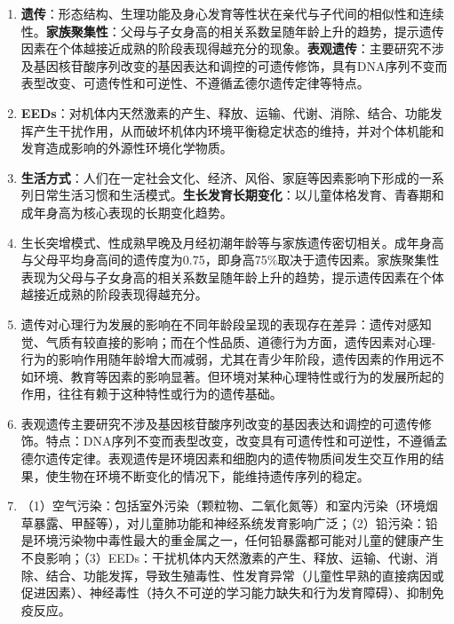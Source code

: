 \begin{enumerate}[leftmargin=*, itemsep=5pt]
    \item \textbf{遗传}：形态结构、生理功能及身心发育等性状在亲代与子代间的相似性和连续性。\textbf{家族聚集性}：父母与子女身高的相关系数呈随年龄上升的趋势，提示遗传因素在个体越接近成熟的阶段表现得越充分的现象。\textbf{表观遗传}：主要研究不涉及基因核苷酸序列改变的基因表达和调控的可遗传修饰，具有DNA序列不变而表型改变、可遗传性和可逆性、不遵循孟德尔遗传定律等特点。

    \item \textbf{EEDs}：对机体内天然激素的产生、释放、运输、代谢、消除、结合、功能发挥产生干扰作用，从而破坏机体内环境平衡稳定状态的维持，并对个体机能和发育造成影响的外源性环境化学物质。

    \item \textbf{生活方式}：人们在一定社会文化、经济、风俗、家庭等因素影响下形成的一系列日常生活习惯和生活模式。\textbf{生长发育长期变化}：以儿童体格发育、青春期和成年身高为核心表现的长期变化趋势。

    \item 生长突增模式、性成熟早晚及月经初潮年龄等与家族遗传密切相关。成年身高与父母平均身高间的遗传度为0.75，即身高75\%取决于遗传因素。家族聚集性表现为父母与子女身高的相关系数呈随年龄上升的趋势，提示遗传因素在个体越接近成熟的阶段表现得越充分。

    \item 遗传对心理行为发展的影响在不同年龄段呈现的表现存在差异：遗传对感知觉、气质有较直接的影响；而在个性品质、道德行为方面，遗传因素对心理-行为的影响作用随年龄增大而减弱，尤其在青少年阶段，遗传因素的作用远不如环境、教育等因素的影响显著。但环境对某种心理特性或行为的发展所起的作用，往往有赖于这种特性或行为的遗传基础。

    \item 表观遗传主要研究不涉及基因核苷酸序列改变的基因表达和调控的可遗传修饰。特点：DNA序列不变而表型改变，改变具有可遗传性和可逆性，不遵循孟德尔遗传定律。表观遗传是环境因素和细胞内的遗传物质间发生交互作用的结果，使生物在环境不断变化的情况下，能维持遗传序列的稳定。

    \item （1）空气污染：包括室外污染（颗粒物、二氧化氮等）和室内污染（环境烟草暴露、甲醛等），对儿童肺功能和神经系统发育影响广泛；（2）铅污染：铅是环境污染物中毒性最大的重金属之一，任何铅暴露都可能对儿童的健康产生不良影响；（3）EEDs：干扰机体内天然激素的产生、释放、运输、代谢、消除、结合、功能发挥，导致生殖毒性、性发育异常（儿童性早熟的直接病因或促进因素）、神经毒性（持久不可逆的学习能力缺失和行为发育障碍）、抑制免疫反应。


\end{enumerate}
